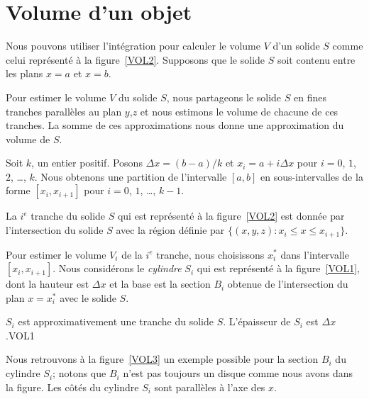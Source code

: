 { 

\section{Volume d'un objet \eng}

Nous pouvons utiliser l'intégration pour calculer le volume $V$ d'un
solide $S$ comme celui représenté à la figure~\ref{VOL2}.  Supposons que le
solide $S$ soit contenu entre les plans $x=a$ et $x=b$.

Pour estimer le volume $V$ du solide $S$, nous partageons le solide
$S$ en fines tranches parallèles au plan $y$,$z$ et nous estimons le
volume de chacune de ces tranches.  La somme de ces approximations
nous donne une approximation du volume de $S$.

Soit $k$, un entier positif.  Posons $\Delta x = (b-a)/k$ et
$x_i = a + i \Delta x$ pour $i=0$, $1$, $2$, \ldots, $k$.  Nous
obtenons une partition de l'intervalle $[a,b]$ en sous-intervalles de
la forme $[x_i,x_{i+1}]$ pour $i=0$, $1$, \ldots, $k-1$.

La $i^e$ tranche du solide $S$ qui est représenté à la figure~\ref{VOL2} est
donnée par l'intersection du solide $S$ avec la région définie par
$\{ (x,y,z) : x_i \leq x \leq x_{i+1}\}$.


Pour estimer le volume $V_i$ de la $i^e$ tranche, nous choisissons
$x_i^\ast$ dans l'intervalle $[x_i,x_{i+1}]$.  Nous considérons le
{\em cylindre} $S_i$ qui est représenté à la figure~\ref{VOL1}, dont la
hauteur est $\Delta x$ et la base est la section $B_i$ obtenue de
l'intersection du plan $x=x_i^\ast$ avec le solide $S$.

{$S_i$ est approximativement une tranche du solide $S$.  L'épaisseur de $S_i$
est $\Delta x$.}{VOL1}

Nous retrouvons à la figure~\ref{VOL3} un exemple possible pour
la section $B_i$ du cylindre $S_i$; notons que $B_i$ n'est pas toujours un
disque comme nous avons dans la figure.  Les côtés du cylindre
$S_i$ sont parallèles à l'axe des $x$.

}
